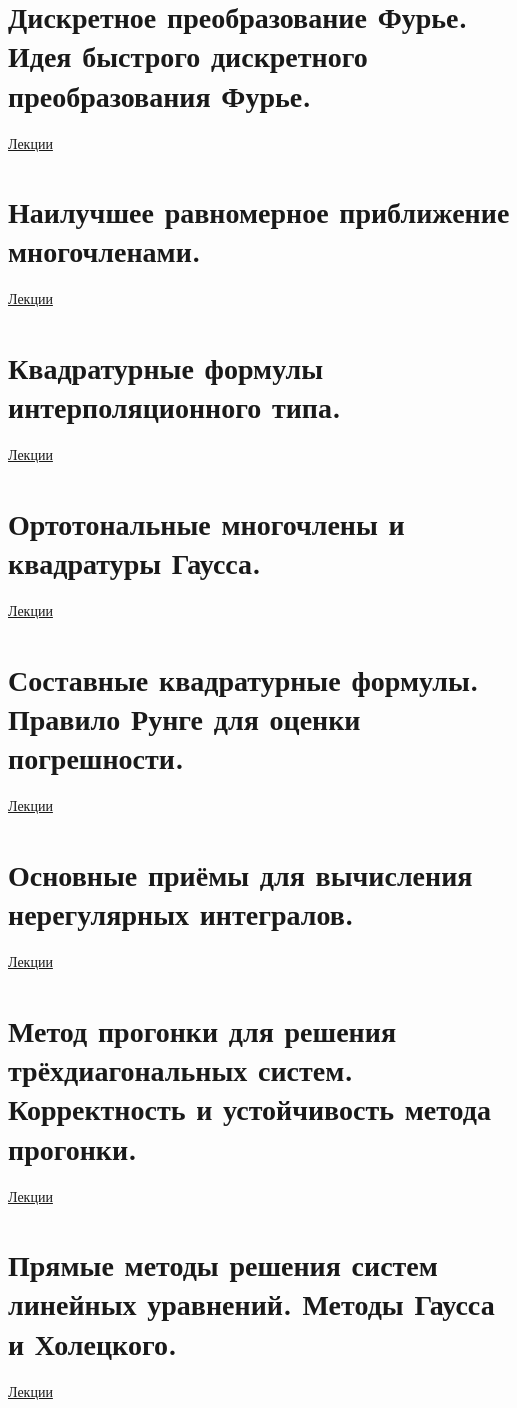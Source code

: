 \documentclass[specialist, subf, href, colorlinks=true, 12pt, times, mtpro, final]{disser}
\theoremstyle{definition}
\begin{document}
\section {Дискретное преобразование Фурье. Идея быстрого дискретного преобразования Фурье.}
	\hyperlink {lects.32}{Лекции}\\

\section {Наилучшее равномерное приближение многочленами.}
	\hyperlink {lects.35}{Лекции}\\

\section {Квадратурные формулы интерполяционного типа.}
	\hyperlink {lects.37}{Лекции}\\

\section {Ортотональные многочлены и квадратуры Гаусса.}
	\hyperlink {lects.40}{Лекции}\\

\section {Составные квадратурные формулы. Правило Рунге для оценки погрешности.}
	\hyperlink {lects.44}{Лекции}\\

\section {Основные приёмы для вычисления нерегулярных интегралов.}
	\hyperlink {lects.45}{Лекции}\\

\section {Метод прогонки для решения трёхдиагональных систем. Корректность и устойчивость метода прогонки.}
	\hyperlink {lects.48}{Лекции}\\

\section {Прямые методы решения систем линейных уравнений. Методы Гаусса и Холецкого.}
	\hyperlink {lects.51}{Лекции}\\
\end{document}
